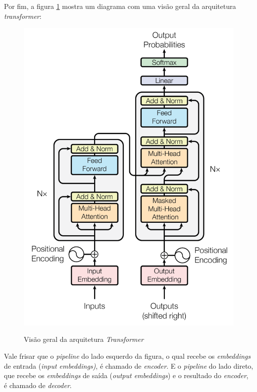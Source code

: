 Por fim, a figura \ref{fig:transformer-architecture} mostra um diagrama com uma visão geral da arquitetura \textit{transformer}:

\begin{figure}[H]
    \centering
    \caption{Visão geral da arquitetura \textit{Transformer}}
    \includegraphics[scale=0.4]{resources/images/conceitos/transformer-architecture.pdf}
    \label{fig:transformer-architecture}
\end{figure}

Vale frisar que o \textit{pipeline} do lado esquerdo da figura, o qual recebe os \textit{embeddings} de entrada (\textit{input embeddings)}, é chamado de \textit{encoder}. E o \textit{pipeline} do lado direto, que recebe os \textit{embeddings} de saída (\textit{output embeddings}) e o resultado do \textit{encoder}, é chamado de \textit{decoder}.


